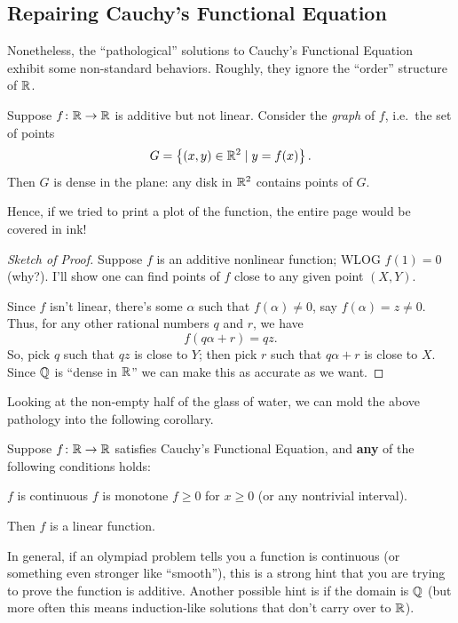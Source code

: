 \documentclass[11pt]{scrartcl}
\begin{document}
\subsection{Repairing Cauchy's Functional Equation}
Nonetheless, the ``pathological'' solutions to Cauchy's Functional Equation
exhibit some non-standard behaviors.
Roughly, they ignore the ``order'' structure of $\mathbb R$.

\begin{theorem}
  Suppose $f \colon \mathbb R \to \mathbb R$ is additive but not linear.
  Consider the \emph{graph} of $f$, i.e.\ the set of points
  \[ G = \left\{ (x,y) \in \mathbb R^2 \mid y = f(x) \right\}. \]
  Then $G$ is dense in the plane:
  any disk in $\mathbb R^2$ contains points of $G$.
\end{theorem}
Hence, if we tried to print a plot of the function,
the entire page would be covered in ink!
\begin{proof}[Sketch of Proof]
  Suppose $f$ is an additive nonlinear function; WLOG $f(1) = 0$ (why?).
  I'll show one can find points of $f$ close to any given point $(X,Y)$.

  Since $f$ isn't linear, there's some $\alpha$ such that $f(\alpha) \neq 0$,
  say $f(\alpha) = z \neq 0$.
  Thus, for any other rational numbers $q$ and $r$, we have
  \[ f(q\alpha+r) = qz. \]
  So, pick $q$ such that $qz$ is close to $Y$;
  then pick $r$ such that $q\alpha+r$ is close to $X$.
  Since $\mathbb Q$ is ``dense in $\mathbb R$'' we can make this as accurate as we want.
\end{proof}

Looking at the non-empty half of the glass of water,
we can mold the above pathology into the following corollary.
\begin{corollary}
  Suppose $f \colon \mathbb R \to \mathbb R$ satisfies Cauchy's Functional Equation,
  and \textbf{any} of the following conditions holds:
  \begin{itemize}
    \ii $f$ is continuous
    \ii $f$ is monotone
    \ii $f \ge 0$ for $x \ge 0$ (or any nontrivial interval).
  \end{itemize}
  Then $f$ is a linear function.
\end{corollary}

In general, if an olympiad problem tells you a function is continuous
(or something even stronger like ``smooth''),
this is a strong hint that you are trying to prove the function is additive.
Another possible hint is if the domain is $\mathbb Q$ (but more often this
means induction-like solutions that don't carry over to $\mathbb R$).
\end{document}
